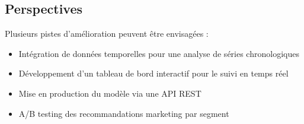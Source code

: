 \documentclass[11pt,a4paper]{article}
\begin{document}
\subsection{Perspectives}

Plusieurs pistes d'amélioration peuvent être envisagées :
\begin{itemize}
    \item Intégration de données temporelles pour une analyse de séries chronologiques
    \item Développement d'un tableau de bord interactif pour le suivi en temps réel
    \item Mise en production du modèle via une API REST
    \item A/B testing des recommandations marketing par segment
\end{itemize}
\end{document}
